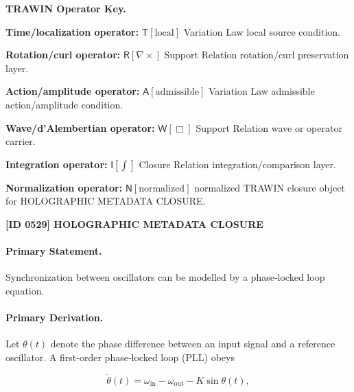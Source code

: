 \par\vspace{0.45\baselineskip}
\noindent\begin{minipage}[t]{\linewidth}
\begingroup
\small
\raggedright
\textbf{TRAWIN Operator Key.}\par
\noindent\textbf{Time/localization operator:} $\mathsf{T}\!\left[\mathrm{local}\right]$ Variation Law local source condition.\par
\noindent\textbf{Rotation/curl operator:} $\mathsf{R}\!\left[\nabla\times\right]$ Support Relation rotation/curl preservation layer.\par
\noindent\textbf{Action/amplitude operator:} $\mathsf{A}\!\left[\mathrm{admissible}\right]$ Variation Law admissible action/amplitude condition.\par
\noindent\textbf{Wave/d'Alembertian operator:} $\mathsf{W}\!\left[\Box\right]$ Support Relation wave or operator carrier.\par
\noindent\textbf{Integration operator:} $\mathsf{I}\!\left[\int\right]$ Closure Relation integration/comparison layer.\par
\noindent\textbf{Normalization operator:} $\mathsf{N}\!\left[\mathrm{normalized}\right]$ normalized TRAWIN closure object for HOLOGRAPHIC METADATA CLOSURE.\par
\endgroup
\end{minipage}

\clearpage
\noindent\textbf{[ID 0529] HOLOGRAPHIC METADATA CLOSURE}\par
\vspace{0.35em}
\paragraph{Primary Statement.}

Synchronization between oscillators can be modelled by a phase‑locked loop equation.

\paragraph{Primary Derivation.}

Let $\theta(t)$ denote the phase difference between an input signal and a reference oscillator.  A first‑order phase‑locked loop (PLL) obeys

\begin{equation}
\dot{\theta}(t) = \omega_{\mathrm{in}} - \omega_{\mathrm{out}} - K\sin\theta(t),
\end{equation}

